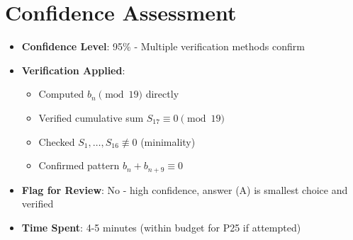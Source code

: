 \documentclass[11pt]{article}
\begin{document}
\section*{Confidence Assessment}
\begin{itemize}[leftmargin=*]
    \item \textbf{Confidence Level}: 95\% - Multiple verification methods confirm
    
    \item \textbf{Verification Applied}: 
    \begin{itemize}
        \item Computed $b_n \pmod{19}$ directly
        \item Verified cumulative sum $S_{17} \equiv 0 \pmod{19}$
        \item Checked $S_1, \ldots, S_{16} \not\equiv 0$ (minimality)
        \item Confirmed pattern $b_n + b_{n+9} \equiv 0$
    \end{itemize}
    
    \item \textbf{Flag for Review}: No - high confidence, answer (A) is smallest choice and verified
    
    \item \textbf{Time Spent}: 4-5 minutes (within budget for P25 if attempted)
\end{itemize}
\end{document}
